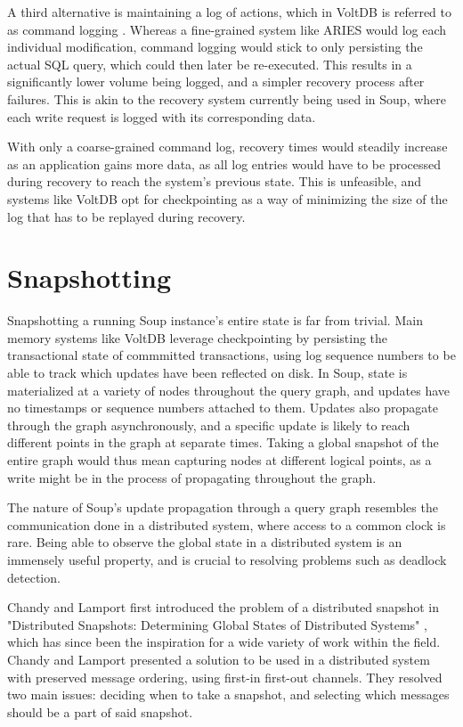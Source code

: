 \documentclass[b5paper]{report}
\begin{document}
A third alternative is maintaining a log of actions, which in VoltDB is referred
to as command logging \cite{voltdb-recovery}. Whereas a fine-grained system like
ARIES would log each individual modification, command logging would stick to
only persisting the actual SQL query, which could then later be re-executed.
This results in a significantly lower volume being logged, and a simpler
recovery process after failures. This is akin to the recovery system currently
being used in Soup, where each write request is logged with its corresponding
data.

With only a coarse-grained command log, recovery times would steadily increase
as an application gains more data, as all log entries would have to be processed
during recovery to reach the system's previous state. This is unfeasible, and
systems like VoltDB opt for checkpointing as a way of minimizing the size of the
log that has to be replayed during recovery.

\section{Snapshotting}
Snapshotting a running Soup instance's entire state is far from trivial.
Main memory systems like VoltDB leverage checkpointing by persisting the
transactional state of commmitted transactions, using log sequence numbers to be
able to track which updates have been reflected on disk. In Soup, state is
materialized at a variety of nodes throughout the query graph, and updates have no
timestamps or sequence numbers attached to them. Updates also propagate through
the graph asynchronously, and a specific update is likely to reach different
points in the graph at separate times. Taking a global snapshot of the entire
graph would thus mean capturing nodes at different logical points, as a write
might be in the process of propagating throughout the graph.

The nature of Soup's update propagation through a query graph resembles the
communication done in a distributed system, where access to a common clock is
rare. Being able to observe the global state in a distributed system is an
immensely useful property, and is crucial to resolving problems such as deadlock
detection.

Chandy and Lamport first introduced the problem of a distributed snapshot in
"Distributed Snapshots: Determining Global States of Distributed Systems"
\cite{chandy-lamport}, which has since been the inspiration for a wide variety
of work within the field. Chandy and Lamport presented a solution to be used in
a distributed system with preserved message ordering, using first-in first-out
channels. They resolved two main issues: deciding when to take a snapshot, and
selecting which messages should be a part of said snapshot.
\end{document}
